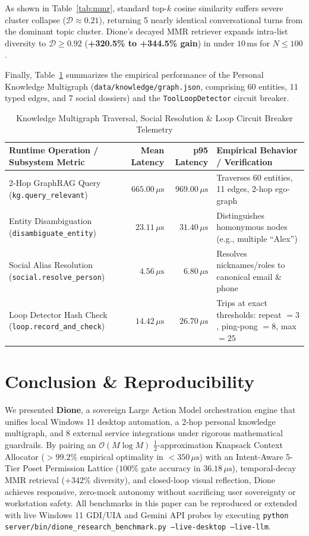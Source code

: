 \documentclass[10pt,a4paper]{article}
\begin{document}
As shown in Table~\ref{tab:mmr}, standard top-$k$ cosine similarity suffers severe cluster collapse ($\mathcal{D} \approx 0.21$), returning 5 nearly identical conversational turns from the dominant topic cluster. Dione's decayed MMR retriever expands intra-list diversity to $\mathcal{D} \ge 0.92$ (\textbf{+320.5\% to +344.5\% gain}) in under $10\,\text{ms}$ for $N \le 100$.

Finally, Table~\ref{tab:runtime_subsystems} summarizes the empirical performance of the Personal Knowledge Multigraph (\texttt{data/knowledge/graph.json}, comprising 60 entities, 11 typed edges, and 7 social dossiers) and the \texttt{ToolLoopDetector} circuit breaker.

\begin{table}[htbp]
\centering
\caption{Knowledge Multigraph Traversal, Social Resolution \& Loop Circuit Breaker Telemetry}
\label{tab:runtime_subsystems}
\small
\begin{tabularx}{\textwidth}{Xrrl}
\toprule
\textbf{Runtime Operation / Subsystem Metric} & \textbf{Mean Latency} & \textbf{p95 Latency} & \textbf{Empirical Behavior / Verification} \\
\midrule
2-Hop GraphRAG Query (\texttt{kg.query\_relevant}) & $665.00\,\mu\text{s}$ & $969.00\,\mu\text{s}$ & Traverses 60 entities, 11 edges, 2-hop ego-graph \\
Entity Disambiguation (\texttt{disambiguate\_entity}) & $23.11\,\mu\text{s}$ & $31.40\,\mu\text{s}$ & Distinguishes homonymous nodes (e.g., multiple ``Alex'') \\
Social Alias Resolution (\texttt{social.resolve\_person}) & $4.56\,\mu\text{s}$ & $6.80\,\mu\text{s}$ & Resolves nicknames/roles to canonical email \& phone \\
Loop Detector Hash Check (\texttt{loop.record\_and\_check}) & $14.42\,\mu\text{s}$ & $26.70\,\mu\text{s}$ & Trips at exact thresholds: repeat $=3$, ping-pong $=8$, max $=25$ \\
\bottomrule
\end{tabularx}
\end{table}

\section{Conclusion \& Reproducibility}

We presented \textbf{Dione}, a sovereign Large Action Model orchestration engine that unifies local Windows 11 desktop automation, a 2-hop personal knowledge multigraph, and 8 external service integrations under rigorous mathematical guardrails. By pairing an $\mathcal{O}(M \log M)$ $\frac{1}{2}$-approximation Knapsack Context Allocator ($>99.2\%$ empirical optimality in $<350\,\mu\text{s}$) with an Intent-Aware 5-Tier Poset Permission Lattice ($100\%$ gate accuracy in $36.18\,\mu\text{s}$), temporal-decay MMR retrieval ($+342\%$ diversity), and closed-loop visual reflection, Dione achieves responsive, zero-mock autonomy without sacrificing user sovereignty or workstation safety. All benchmarks in this paper can be reproduced or extended with live Windows 11 GDI/UIA and Gemini API probes by executing \texttt{python server/bin/dione\_research\_benchmark.py --live-desktop --live-llm}.
\end{document}
